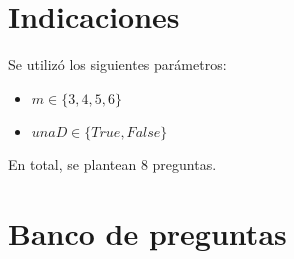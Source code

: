 \documentclass[a4,11pt]{aleph-notas}
\begin{document}
\encabezado

\section{Indicaciones}



Se utilizó los siguientes parámetros:
\begin{itemize}
	\item $m \in \{3, 4, 5, 6\}$
	\item $unaD \in \{True, False\}$

\end{itemize}
En total, se plantean 8 preguntas.


\section{Banco de preguntas}
\end{document}
